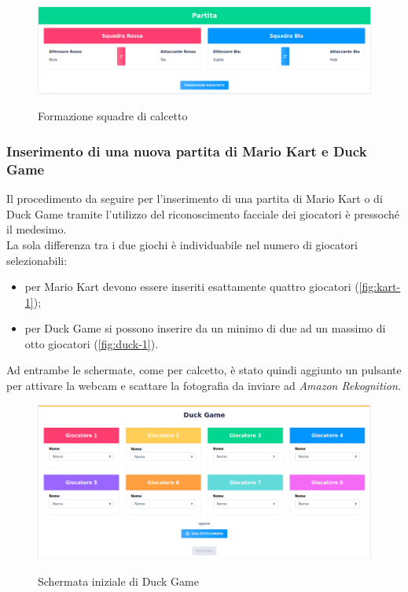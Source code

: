 		\begin{figure}[H]
			\centering
			\includegraphics[width=\textwidth]{immagini/calcetto-3.png} \\
			\caption{\label{fig:calcetto-3} Formazione squadre di calcetto}
		\end{figure}
		
		
		\subsubsection{Inserimento di una nuova partita di Mario Kart e Duck Game}
		Il procedimento da seguire per l'inserimento di una partita di Mario Kart o di Duck Game tramite l'utilizzo del riconoscimento facciale dei giocatori è pressoché il medesimo. \\
		La sola differenza tra i due giochi è individuabile nel numero di giocatori selezionabili: 
		\begin{itemize}
			\item per Mario Kart devono essere inseriti esattamente quattro giocatori (\autoref{fig:kart-1});
			\item per Duck Game si possono inserire da un minimo di due ad un massimo di otto giocatori (\autoref{fig:duck-1}).
		\end{itemize}
	
		Ad entrambe le schermate, come per calcetto, è stato quindi aggiunto un pulsante per attivare la webcam e scattare la fotografia da inviare ad \emph{Amazon Rekognition}.
		
		\begin{figure}[H]
			\centering
			\includegraphics[width=\textwidth]{immagini/duck-1.png} \\
			\caption{\label{fig:duck-1} Schermata iniziale di Duck Game}
		\end{figure}
	
